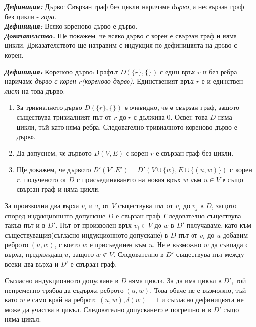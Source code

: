 \documentclass[11pt]{article} %
\newcommand{\italicBold}[1]{\textbf{\emph{#1}}}
\newcommand{\definition}{\italicBold{Дефиниция: }}
\newcommand{\proof}{\italicBold{Доказателство: }}
\newcommand{\curlies}[1]{\{#1\}}
\newcommand{\enumlet}{\renewcommand{\theenumi}{\alph{enumi}}}
\begin{document}
\definition Дърво: Свързан граф без цикли наричаме \textit{дърво}, а несвързан граф без цикли - \textit{гора}.\\

\definition Всяко кореново дърво е дърво.\\
\proof Ще покажем, че всяко дърво с корен е свързан граф и няма цикли. Доказателството ще направим с индукция по дефиницията на дръво с корен.

\definition Кореново дърво: Графът $D(\curlies{r}, \curlies{})$ с един връх $r$ и без ребра наричаме \textit{дърво с корен $r$(кореново дърво)}. Единственият връх $r$ е и единствен \textit{лист} на това дърво. 

\enumlet
\begin{enumerate}
	\item За тривиалното дърво $D(\curlies{r}, \curlies{})$ е очевидно, че е свързан граф, защото съществува тривиалният път от $r$ до $r$ с дължина 0. Освен това $D$ няма цикли, тъй като няма ребра. Следователно тривиалното кореново дърво е дърво. \\
	\item Да допуснем, че дървото $D(V, E)$ с корен $r$ е свързан граф без цикли. \\
	\item Ще докажем, че дървото $D'(V'. E') = D'(V \cup \curlies{w}, E \cup \curlies{(u, w)})$ с корен $r$, полученото от $D$ с присъединяването на новия връх $w$ към $u \in V$ е също свързан граф и няма цикли. 
\end{enumerate}\par

За произволни два върха $v_{i}$ и $v_{j}$ от $V$ съществува път от $v_{i}$ до $v_{j}$ в $D$, защото според индукционното допускане $D$ е свързан граф. Следователно съществува такъв път и в $D'$. Път от произволен връх $v_{i} \in V$ до $w$ в $D'$ получаваме, като към съществуващия(съгласно индукционното допускане) в $D$ път от $v_{i}$ до $u$ добавим реброто $(u, w)$, с което $w$ е присъединен към $u$. Не е възможно $w$ да съвпада с върха, предхождащ $u$, защото $w \not\in V$. Следователно в $D'$ съществува път между всеки два върха и $D'$ е свързан граф. \par

Съгласно индукционното допускане в $D$ няма цикли. За да има цикъл в $D'$, той непременно трябва да съдържа реброто $(u, w)$. Това обаче не е възможно, тъй като $w$ е само край на реброто $(u, w), d(w) = 1$ и съгласно дефиницията не може да участва в цикъл. Следователно допускането е погрешно и в $D'$ също няма цикъл.\par 
\end{document}
